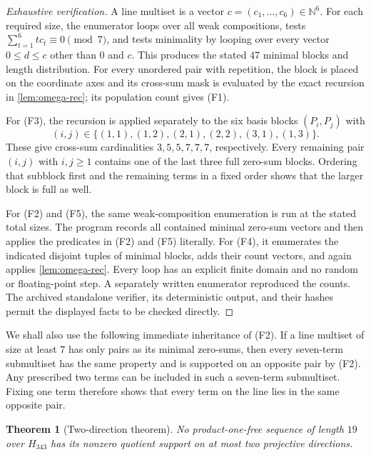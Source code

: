 \documentclass[11pt]{amsart}
\newtheorem{theorem}{Theorem}[section]
\theoremstyle{definition}
\newcommand{\HH}{H_{343}}
\begin{document}
\begin{proof}[Exhaustive verification]
A line multiset is a vector $c=(c_1,\ldots,c_6)\in\mathbb N^6$.
For each required size, the enumerator loops over all weak
compositions, tests $\sum_{t=1}^6tc_t\equiv0\pmod7$, and tests
minimality by looping over every vector $0\leq d\leq c$ other than
$0$ and $c$.  This produces the stated $47$ minimal blocks and length
distribution.  For every unordered pair with repetition, the block is
placed on the coordinate axes and its cross-sum mask is evaluated by
the exact recursion in \cref{lem:omega-rec}; its population count gives
(F1).

For (F3), the recursion is applied separately to the six basis blocks
$(P_i,P_j)$ with
\[
(i,j)\in\{(1,1),(1,2),(2,1),(2,2),(3,1),(1,3)\}.
\]
These give cross-sum cardinalities $3,5,5,7,7,7$, respectively.
Every remaining pair $(i,j)$ with $i,j\geq1$ contains one of the last
three full zero-sum blocks.  Ordering that subblock first and the
remaining terms in a fixed order shows that the larger block is full
as well.

For (F2) and (F5), the same weak-composition enumeration is run at the
stated total sizes.  The program records all contained minimal
zero-sum vectors and then applies the predicates in (F2) and (F5)
literally.  For (F4), it enumerates the indicated disjoint tuples of
minimal blocks, adds their count vectors, and again applies
\cref{lem:omega-rec}.  Every loop has an explicit finite domain and no
random or floating-point step.  A separately written enumerator
reproduced the counts.  The archived standalone verifier, its deterministic
output, and their hashes permit the displayed facts to be checked directly.
\end{proof}

We shall also use the following immediate inheritance of (F2).  If a
line multiset of size at least $7$ has only pairs as its minimal
zero-sums, then every seven-term submultiset has the same property and
is supported on an opposite pair by (F2).  Any prescribed two terms
can be included in such a seven-term submultiset.  Fixing one term
therefore shows that every term on the line lies in the same opposite
pair.

\begin{theorem}[Two-direction theorem]\label{thm:two}
No product-one-free sequence of length $19$ over $\HH$ has its nonzero quotient support on at most two projective directions.
\end{theorem}
\end{document}
